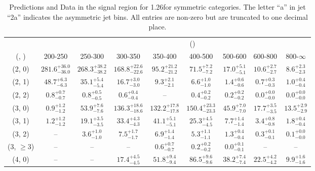 \begin{table}[h!]
\tiny
\centering
\caption{Predictions and Data in the signal region for 1.26\ifb for symmetric categories. The letter ``a'' in jet \eg ``2a''  indicates the asymmetric jet bins. All entries are non-zero but are truncated to one decimal place.\label{tab:yieldsseppost_sig_ttw_sym}}
\begin{tabular}
{ccccccccc}
	\hline\hline
&	& \multicolumn{8}{c}{\scalht (\gev)} \\ 
	 (\njet,  \nb) & 200-250 & 250-300 & 300-350 & 350-400 & 400-500 & 500-600 & 600-800 & 800-$\infty$ \\ [0.8ex] 
\hline
	(2, 0) & $281.6^{+ 36.0 }_{- 36.0 }$ & $268.3^{+ 38.2 }_{- 38.2 }$ & $168.8^{+ 22.6 }_{- 22.6 }$ & $95.2^{+ 21.2 }_{- 21.2 }$ & $71.5^{+ 7.2 }_{- 7.2 }$ & $17.0^{+ 5.1 }_{- 5.1 }$ & $10.6^{+ 2.7 }_{- 2.7 }$ & $8.6^{+ 2.3 }_{- 2.3 }$ \\[0.5ex] 
	(2, 1) & $48.7^{+ 6.3 }_{- 6.3 }$ & $35.1^{+ 5.4 }_{- 5.4 }$ & $16.7^{+ 3.0 }_{- 3.0 }$ & $9.3^{+ 2.1 }_{- 2.1 }$ & $6.6^{+ 1.0 }_{- 1.0 }$ & $1.4^{+ 0.6 }_{- 0.6 }$ & $0.7^{+ 0.3 }_{- 0.3 }$ & $1.0^{+ 0.4 }_{- 0.4 }$ \\[0.5ex] 
	(2, 2) & $0.8^{+ 0.7 }_{- 0.7 }$ & $0.8^{+ 0.5 }_{- 0.5 }$ & $0.6^{+ 0.4 }_{- 0.4 }$ & -- & $0.4^{+ 0.2 }_{- 0.2 }$ & $0.2^{+ 0.2 }_{- 0.2 }$ & $0.0^{+ 0.0 }_{- 0.0 }$ & $0.0^{+ 0.0 }_{- 0.0 }$ \\[0.5ex] 
	(3, 0) & $0.9^{+ 1.2 }_{- 1.2 }$ & $53.9^{+ 7.6 }_{- 7.6 }$ & $136.3^{+ 18.6 }_{- 18.6 }$ & $132.2^{+ 17.8 }_{- 17.8 }$ & $150.4^{+ 23.3 }_{- 23.3 }$ & $45.9^{+ 7.0 }_{- 7.0 }$ & $17.7^{+ 3.5 }_{- 3.5 }$ & $13.5^{+ 2.9 }_{- 2.9 }$ \\[0.5ex] 
	(3, 1) & $1.2^{+ 1.2 }_{- 1.2 }$ & $19.1^{+ 3.5 }_{- 3.5 }$ & $33.4^{+ 4.3 }_{- 4.3 }$ & $41.1^{+ 5.1 }_{- 5.1 }$ & $25.3^{+ 4.5 }_{- 4.5 }$ & $7.7^{+ 1.4 }_{- 1.4 }$ & $3.4^{+ 0.8 }_{- 0.8 }$ & $1.8^{+ 0.4 }_{- 0.4 }$ \\[0.5ex] 
	(3, 2) & -- & $3.6^{+ 1.0 }_{- 1.0 }$ & $7.5^{+ 1.7 }_{- 1.7 }$ & $6.9^{+ 1.4 }_{- 1.4 }$ & $5.3^{+ 1.1 }_{- 1.1 }$ & $1.3^{+ 0.4 }_{- 0.4 }$ & $0.3^{+ 0.1 }_{- 0.1 }$ & $0.1^{+ 0.0 }_{- 0.0 }$ \\[0.5ex] 
	(3, $\ge3$) & -- & -- & -- & $0.6^{+ 0.7 }_{- 0.7 }$ & $0.2^{+ 0.2 }_{- 0.2 }$ & $0.0^{+ 0.1 }_{- 0.1 }$ & -- & -- \\[0.5ex] 
	(4, 0) & -- & -- & $17.4^{+ 4.5 }_{- 4.5 }$ & $51.8^{+ 9.4 }_{- 9.4 }$ & $86.5^{+ 9.6 }_{- 9.6 }$ & $38.2^{+ 7.4 }_{- 7.4 }$ & $22.5^{+ 4.2 }_{- 4.2 }$ & $9.9^{+ 1.6 }_{- 1.6 }$ \\[0.5ex] 

\end{tabular}
\end{table}
